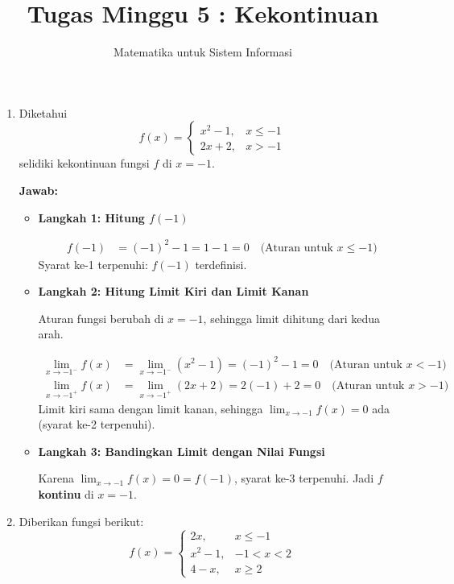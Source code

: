 \documentclass[10pt,a4paper]{article}
\title{Tugas Minggu 5 : Kekontinuan}
\author{Matematika untuk Sistem Informasi}
\date{}
\newcounter{eqblock}
\newcommand{\reseteq}{%
  \stepcounter{eqblock}%
  \setcounter{equation}{0}%
  \renewcommand{\theHequation}{\arabic{eqblock}.\arabic{equation}}%
}
\begin{document}
\maketitle

\begin{enumerate}

\item Diketahui
\[
f(x) =
\begin{cases}
  x^2 - 1, & x \leq -1 \\
  2x + 2, & x > -1
\end{cases}
\]
selidiki kekontinuan fungsi $f$ di $x = -1$.

\textbf{Jawab:}
\begin{itemize}
\item \textbf{Langkah 1: Hitung $f(-1)$}

\reseteq
\begin{align}
f(-1) &= (-1)^2 - 1 = 1 - 1 = 0 \quad \text{(Aturan untuk $x \leq -1$)}
\end{align}
Syarat ke-1 terpenuhi: $f(-1)$ terdefinisi.

\item \textbf{Langkah 2: Hitung Limit Kiri dan Limit Kanan}

Aturan fungsi berubah di $x = -1$, sehingga limit dihitung dari kedua arah.
\reseteq
\begin{align}
\lim_{x \to -1^-} f(x) &= \lim_{x \to -1^-} (x^2 - 1) = (-1)^2 - 1 = 0 \quad \text{(Aturan untuk $x < -1$)} \\
\lim_{x \to -1^+} f(x) &= \lim_{x \to -1^+} (2x + 2) = 2(-1) + 2 = 0 \quad \text{(Aturan untuk $x > -1$)}
\end{align}
Limit kiri sama dengan limit kanan, sehingga $\lim_{x \to -1} f(x) = 0$ ada (syarat ke-2 terpenuhi).

\item \textbf{Langkah 3: Bandingkan Limit dengan Nilai Fungsi}

Karena $\lim_{x \to -1} f(x) = 0 = f(-1)$, syarat ke-3 terpenuhi.
Jadi $f$ \textbf{kontinu} di $x = -1$.
\end{itemize}

\item Diberikan fungsi berikut:
\[
f(x) =
\begin{cases}
  2x, & x \leq -1 \\
  x^2 - 1, & -1 < x < 2 \\
  4 - x, & x \geq 2
\end{cases}
\]
\begin{enumerate}


\end{enumerate}
\end{enumerate}
\end{document}
